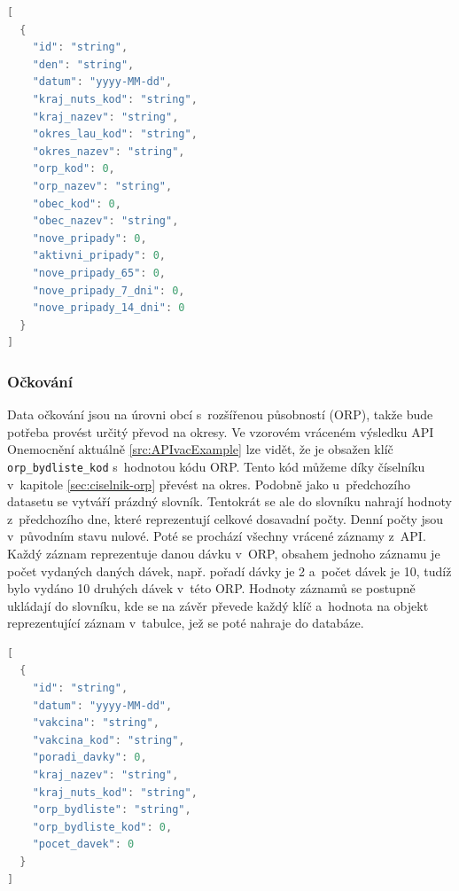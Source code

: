 \clearpage

\begin{lstlisting}[language=Java,label=src:APIinfectionsExample,caption={Schéma vrácených dat z datasetu \emph{obce} z API Onemocnění aktuálně}]
[
  {
    "id": "string",
    "den": "string",
    "datum": "yyyy-MM-dd",
    "kraj_nuts_kod": "string",
    "kraj_nazev": "string",
    "okres_lau_kod": "string",
    "okres_nazev": "string",
    "orp_kod": 0,
    "orp_nazev": "string",
    "obec_kod": 0,
    "obec_nazev": "string",
    "nove_pripady": 0,
    "aktivni_pripady": 0,
    "nove_pripady_65": 0,
    "nove_pripady_7_dni": 0,
    "nove_pripady_14_dni": 0
  }
]
\end{lstlisting}

\subsubsection*{Očkování}

Data očkování jsou na úrovni obcí s~rozšířenou působností (ORP), takže bude potřeba provést určitý převod na okresy. Ve vzorovém vráceném výsledku API Onemocnění aktuálně \ref{src:APIvacExample} lze vidět, že je obsažen klíč \texttt{orp\_bydliste\_kod} s~hodnotou kódu ORP. Tento kód můžeme díky číselníku v~kapitole \ref{sec:ciselnik-orp} převést na okres. Podobně jako u~předchozího datasetu se vytváří prázdný slovník. Tentokrát se ale do slovníku nahrají hodnoty z~předchozího dne, které reprezentují celkové dosavadní počty. Denní počty jsou v~původním stavu nulové. Poté se prochází všechny vrácené záznamy z~API. Každý záznam reprezentuje danou dávku v~ORP, obsahem jednoho záznamu je počet vydaných daných dávek, např. pořadí dávky je 2 a~počet dávek je 10, tudíž bylo vydáno 10 druhých dávek v~této ORP. Hodnoty záznamů se postupně ukládají do slovníku, kde se na závěr převede každý klíč a~hodnota na objekt reprezentující záznam v~tabulce, jež se poté nahraje do databáze.

\clearpage

\begin{lstlisting}[language=Java,label=src:APIvacExample,caption={Schéma vrácených dat z datasetu \emph{ockovani-geografie} z API Onemocnění aktuálně}]
[
  {
    "id": "string",
    "datum": "yyyy-MM-dd",
    "vakcina": "string",
    "vakcina_kod": "string",
    "poradi_davky": 0,
    "kraj_nazev": "string",
    "kraj_nuts_kod": "string",
    "orp_bydliste": "string",
    "orp_bydliste_kod": 0,
    "pocet_davek": 0
  }
]
\end{lstlisting}

